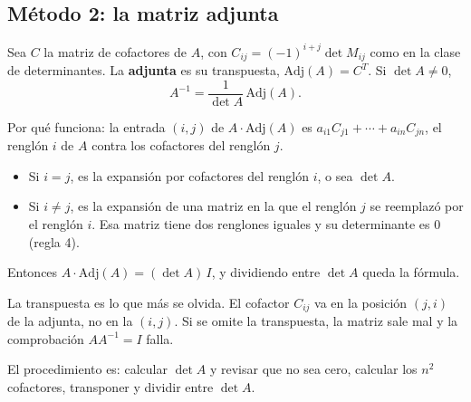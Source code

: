 \documentclass[11pt,letterpaper]{article}
\begin{document}

\subsection*{Método 2: la matriz adjunta}

\begin{definicion}[Adjunta]
    Sea $C$ la matriz de cofactores de $A$, con
    $C_{ij} = (-1)^{i+j} \det M_{ij}$ como en la clase de
    determinantes. La \textbf{adjunta} es su transpuesta,
    $\mathrm{Adj}(A) = C^{T}$. Si $\det A \neq 0$,
    \[
        A^{-1} = \frac{1}{\det A}\, \mathrm{Adj}(A) .
    \]
\end{definicion}

Por qué funciona: la entrada $(i, j)$ de $A \cdot \mathrm{Adj}(A)$ es
$a_{i1}C_{j1} + \cdots + a_{in}C_{jn}$, el renglón $i$ de $A$ contra
los cofactores del renglón $j$.

\begin{itemize}[itemsep=0.2em]
    \item Si $i = j$, es la expansión por cofactores del renglón $i$,
          o sea $\det A$.
    \item Si $i \neq j$, es la expansión de una matriz en la que el
          renglón $j$ se reemplazó por el renglón $i$. Esa matriz
          tiene dos renglones iguales y su determinante es $0$
          (regla 4).
\end{itemize}

Entonces $A \cdot \mathrm{Adj}(A) = (\det A)\, I$, y dividiendo entre
$\det A$ queda la fórmula.

\begin{ojo}
    La transpuesta es lo que más se olvida. El cofactor $C_{ij}$ va en
    la posición $(j, i)$ de la adjunta, no en la $(i, j)$. Si se omite
    la transpuesta, la matriz sale mal y la comprobación
    $AA^{-1} = I$ falla.
\end{ojo}

El procedimiento es: calcular $\det A$ y revisar que no sea cero,
calcular los $n^2$ cofactores, transponer y dividir entre $\det A$.
\end{document}
